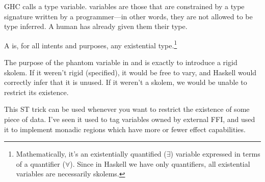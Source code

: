 \documentclass[book.tex]{subfiles}
\begin{document}
GHC calls  a  type variable. 
variables are those that are constrained by a type signature written by a
programmer---in other words, they are not allowed to be type inferred. A human
has already given them their type.

A  is, for all intents and purposes, any existential
type.\footnote{Mathematically, it's an existentially quantified ($\exists$)
variable expressed in terms of a  quantifier ($\forall$). Since in
Haskell we have only  quantifiers, all existential variables are
necessarily skolems.}

The purpose of the phantom  variable in  and  is exactly
to introduce a rigid skolem. If it weren't rigid (specified), it would be free
to vary, and Haskell would correctly infer that it is unused. If it weren't
a skolem, we would be unable to restrict its existence.

This ST trick can be used whenever you want to restrict the existence of some
piece of data. I've seen it used to tag variables owned by external FFI, and
used it to implement monadic regions which have more or fewer effect
capabilities.
\end{document}
